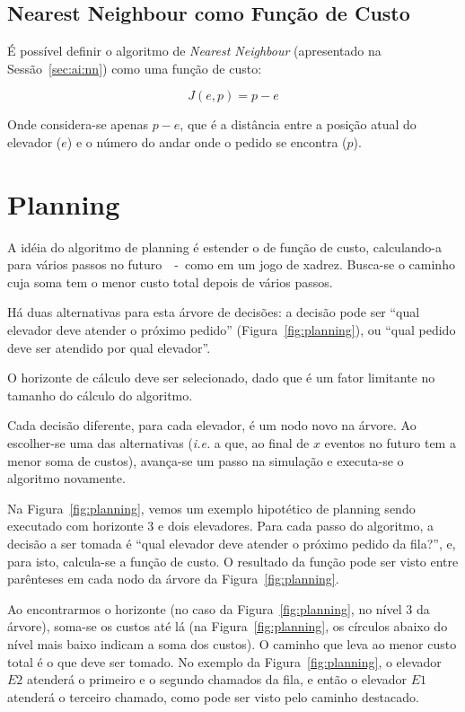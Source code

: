 \subsection{Nearest Neighbour como Função de Custo}

É possível definir o algoritmo de \textit{Nearest Neighbour} (apresentado na
Sessão~\ref{sec:ai:nn}) como uma função de
custo:

\[J(e, p) = p - e\]

Onde considera-se apenas $p - e$, que é a distância entre a posição atual do
elevador ($e$) e o número do andar onde o pedido se encontra ($p$).

\section{Planning}


A idéia do algoritmo de planning é estender o de função de custo, calculando-a
para vários passos no futuro~\cite{Koehler00elevatorcontrol}~-~como em um jogo de xadrez. Busca-se o
caminho cuja soma tem o menor custo total depois de vários passos.

Há duas alternativas para esta árvore de decisões: a decisão pode ser ``qual
elevador deve atender o próximo pedido'' (Figura~\ref{fig:planning}),
ou ``qual pedido deve ser atendido por qual elevador''. %

O horizonte de cálculo deve ser selecionado, dado que é um fator limitante no
tamanho do cálculo do algoritmo.

Cada decisão diferente, para cada elevador, é um nodo novo na árvore. Ao
escolher-se uma das alternativas (\textit{i.e.} a que, ao final de $x$ eventos
no futuro tem a menor soma de custos), avança-se um passo na simulação e executa-se o
algoritmo novamente.

Na Figura~\ref{fig:planning}, vemos um exemplo hipotético de planning sendo executado com
horizonte 3 e dois elevadores. Para cada passo do algoritmo, a decisão a ser
tomada é ``qual elevador deve atender o próximo pedido da fila?'', e, para isto,
calcula-se a função de custo. O resultado da função pode ser visto entre
parênteses em cada nodo da árvore da Figura~\ref{fig:planning}.

Ao encontrarmos o horizonte (no caso da Figura~\ref{fig:planning}, no nível 3 da
árvore), soma-se os custos até lá (na Figura~\ref{fig:planning}, os círculos
abaixo do nível mais baixo indicam a soma dos custos). O caminho que leva ao
menor custo total é o que deve ser tomado. No exemplo da Figura~\ref{fig:planning}, o
elevador $E2$ atenderá o primeiro e o segundo chamados da fila, e então o
elevador $E1$ atenderá o terceiro chamado, como pode ser visto pelo caminho destacado.


